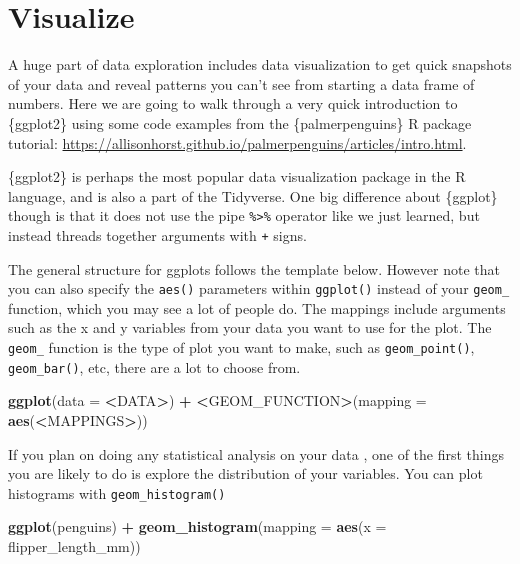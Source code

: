 \documentclass[
]{book}
\newenvironment{Shaded}{\begin{snugshade}}{\end{snugshade}}
\newcommand{\AttributeTok}[1]{\textcolor[rgb]{0.13,0.29,0.53}{#1}}
\newcommand{\ErrorTok}[1]{\textcolor[rgb]{0.64,0.00,0.00}{\textbf{#1}}}
\newcommand{\FunctionTok}[1]{\textcolor[rgb]{0.13,0.29,0.53}{\textbf{#1}}}
\newcommand{\NormalTok}[1]{#1}
\newcommand{\SpecialCharTok}[1]{\textcolor[rgb]{0.81,0.36,0.00}{\textbf{#1}}}
\begin{document}
\hypertarget{visualize}{%
\section{Visualize}\label{visualize}}

A huge part of data exploration includes data visualization to get quick snapshots of your data and reveal patterns you can't see from starting a data frame of numbers. Here we are going to walk through a very quick introduction to \{ggplot2\} using some code examples from the \{palmerpenguins\} R package tutorial: \url{https://allisonhorst.github.io/palmerpenguins/articles/intro.html}.

\{ggplot2\} is perhaps the most popular data visualization package in the R language, and is also a part of the Tidyverse. One big difference about \{ggplot\} though is that it does not use the pipe \texttt{\%\textgreater{}\%} operator like we just learned, but instead threads together arguments with \texttt{+} signs.

The general structure for ggplots follows the template below. However note that you can also specify the \texttt{aes()} parameters within \texttt{ggplot()} instead of your \texttt{geom\_} function, which you may see a lot of people do. The mappings include arguments such as the x and y variables from your data you want to use for the plot. The \texttt{geom\_} function is the type of plot you want to make, such as \texttt{geom\_point()}, \texttt{geom\_bar()}, etc, there are a lot to choose from.

\begin{Shaded}
\begin{Highlighting}[]
\FunctionTok{ggplot}\NormalTok{(}\AttributeTok{data =} \SpecialCharTok{\textless{}}\NormalTok{DATA}\SpecialCharTok{\textgreater{}}\NormalTok{) }\SpecialCharTok{+} 
  \ErrorTok{\textless{}}\NormalTok{GEOM\_FUNCTION}\SpecialCharTok{\textgreater{}}\NormalTok{(}\AttributeTok{mapping =} \FunctionTok{aes}\NormalTok{(}\SpecialCharTok{\textless{}}\NormalTok{MAPPINGS}\SpecialCharTok{\textgreater{}}\NormalTok{))}
\end{Highlighting}
\end{Shaded}

If you plan on doing any statistical analysis on your data , one of the first things you are likely to do is explore the distribution of your variables. You can plot histograms with \texttt{geom\_histogram()}

\begin{Shaded}
\begin{Highlighting}[]
\FunctionTok{ggplot}\NormalTok{(penguins) }\SpecialCharTok{+} 
  \FunctionTok{geom\_histogram}\NormalTok{(}\AttributeTok{mapping =} \FunctionTok{aes}\NormalTok{(}\AttributeTok{x =}\NormalTok{ flipper\_length\_mm))}
\end{Highlighting}
\end{Shaded}
\end{document}
